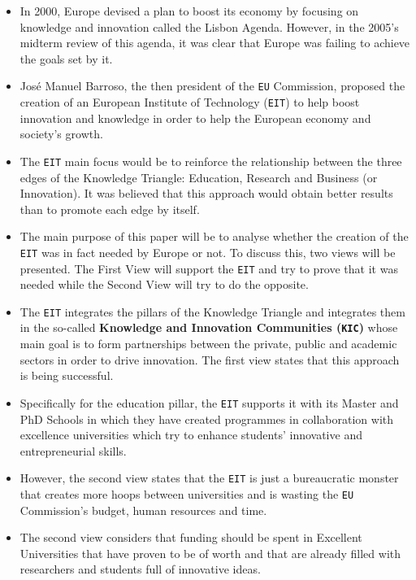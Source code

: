 \documentclass[11pt,a4paper,oneside,twocolumn]{IEEEtran}
\begin{document}
\begin{itemize}
    \item In 2000, Europe devised a plan to boost its economy by focusing on knowledge and innovation called the Lisbon Agenda. However, in the 2005's midterm review of this agenda, it was clear that Europe was failing to achieve the goals set by it.
    \item Jos\'e Manuel Barroso, the then president of the \texttt{EU} Commission, proposed the creation of an European Institute of Technology (\texttt{EIT}) to help boost innovation and knowledge in order to help the European economy and society's growth.
    \item The \texttt{EIT} main focus would be to reinforce the relationship between the three edges of the Knowledge Triangle: Education, Research and Business (or Innovation). It was believed that this approach would obtain better results than to promote each edge by itself.
    \item The main purpose of this paper will be to analyse whether the creation of the \texttt{EIT} was in fact needed by Europe or not. To discuss this, two views will be presented. The First View will support the \texttt{EIT} and try to prove that it was needed while the Second View will try to do the opposite.
    \item The \texttt{EIT} integrates the pillars of the Knowledge Triangle and integrates them in the so-called \textbf{Knowledge and Innovation Communities (\texttt{KIC})} whose main goal is to form partnerships between the private, public and academic sectors in order to drive innovation. The first view states that this approach is being successful.
    \item Specifically for the education pillar, the \texttt{EIT} supports it with its Master and PhD Schools in which they have created programmes in collaboration with excellence universities which try to enhance students' innovative and entrepreneurial skills.
    \item However, the second view states that the \texttt{EIT} is just a bureaucratic monster that creates more hoops between universities and is wasting the \texttt{EU} Commission's budget, human resources and time.
    \item The second view considers that funding should be spent in Excellent Universities that have proven to be of worth and that are already filled with researchers and students full of innovative ideas.
\end{itemize}
\end{document}
